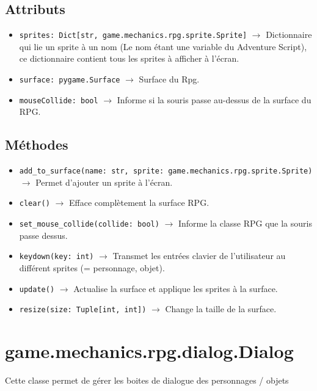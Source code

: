 \documentclass{report}
\begin{document}
\subsection*{Attributs}
\begin{itemize}
  \item \texttt{sprites: Dict[str, game.mechanics.rpg.sprite.Sprite]}	$\rightarrow$ Dictionnaire qui lie un sprite à un nom (Le nom étant une variable du Adventure Script), ce dictionnaire contient tous les sprites à afficher à l’écran.
  \item \texttt{surface: pygame.Surface}	$\rightarrow$ Surface du Rpg.
  \item \texttt{mouseCollide: bool} $\rightarrow$ Informe si la souris passe au-dessus de la surface du RPG.
\end{itemize}

\subsection*{Méthodes}
\begin{itemize}
  \item \texttt{add_to_surface(name: str, sprite: game.mechanics.rpg.sprite.Sprite)}	$\rightarrow$ Permet d’ajouter un sprite à l’écran.

  \item \texttt{clear()} $\rightarrow$ Efface complètement la surface RPG.

  \item \texttt{set_mouse_collide(collide: bool)} $\rightarrow$ Informe la classe RPG que la souris passe dessus.

  \item \texttt{keydown(key: int)} $\rightarrow$ Transmet les entrées clavier de l'utilisateur au différent sprites (= personnage, objet).

  \item \texttt{update()}	$\rightarrow$  Actualise la surface et applique les sprites à la surface.
  \item \texttt{resize(size: Tuple[int, int])}	$\rightarrow$ Change la taille de la surface.
\end{itemize}
\newpage

\section{game.mechanics.rpg.dialog.Dialog}
Cette classe permet de gérer les boites de dialogue des personnages / objets
\end{document}
